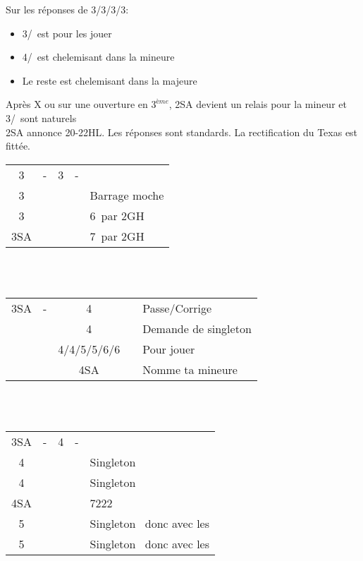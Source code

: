 \documentclass[a4paper, oneside, 11pt]{report}
\begin{document}
	Sur les réponses de 3\trefle/3\carreau/3\coeur/3\pique:
	\begin{itemize}
	\item 3\coeur/\pique\ est pour les jouer
	\item 4\trefle/\carreau\ est chelemisant dans la mineure
	\item Le reste est chelemisant dans la majeure\\
	\end{itemize}
	
	Après X ou sur une ouverture en $3^{ème}$, 2SA devient un relais pour la mineur et 3\trefle/\carreau\ sont naturels\\

	2SA annonce 20-22HL. Les réponses sont standards. La rectification du Texas est fittée.\\

	\Section{3\trefle}
	\begin{tabular}{cccc|l}
	3\trefle & - & 3\carreau & - &\\
	3\coeur &&&& Barrage moche\\
	3\pique &&&& 6\trefle\ par 2GH\\
	3SA &&&& 7\trefle\ par 2GH\\
	\end{tabular}\\\\

	\begin{tabular}{cccc|l}
	3SA & - & 4\trefle && Passe/Corrige\\
	&& 4\carreau && Demande de singleton\\
	&& 4\coeur/4\pique/5\trefle/5\carreau/6\trefle/6\carreau && Pour jouer\\
	&& 4SA && Nomme ta mineure\\
	\end{tabular}\\\\
	
	\begin{tabular}{cccc|l}
	3SA & - & 4\carreau & - &\\
	4\coeur &&&& Singleton \coeur\\
	4\pique &&&& Singleton \pique\\
	4SA &&&& 7222\\
	5\trefle &&&& Singleton \carreau\ donc avec les \trefle\\
	5\carreau &&&& Singleton \trefle\ donc avec les \carreau\\
	\end{tabular}\\\\
	
\end{document}
